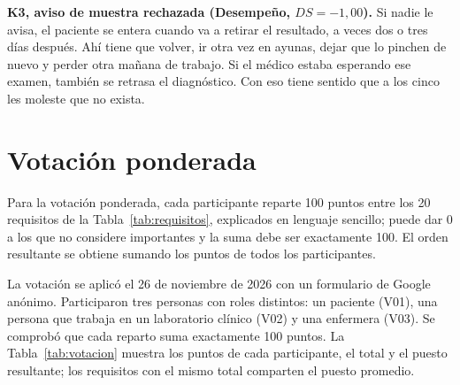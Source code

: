 \documentclass[11pt,a4paper]{article}
\begin{document}
\textbf{K3, aviso de muestra rechazada (Desempeño, $DS = -1{,}00$).} Si nadie le avisa, el paciente se entera cuando va a retirar el resultado, a veces dos o tres días después. Ahí tiene que volver, ir otra vez en ayunas, dejar que lo pinchen de nuevo y perder otra mañana de trabajo. Si el médico estaba esperando ese examen, también se retrasa el diagnóstico. Con eso tiene sentido que a los cinco les moleste que no exista.

\section{Votación ponderada}
Para la votación ponderada, cada participante reparte 100 puntos entre los 20 requisitos de la Tabla~\ref{tab:requisitos}, explicados en lenguaje sencillo; puede dar 0 a los que no considere importantes y la suma debe ser exactamente 100. El orden resultante se obtiene sumando los puntos de todos los participantes.

La votación se aplicó el 26 de noviembre de 2026 con un formulario de Google anónimo. Participaron tres personas con roles distintos: un paciente (V01), una persona que trabaja en un laboratorio clínico (V02) y una enfermera (V03). Se comprobó que cada reparto suma exactamente 100 puntos. La Tabla~\ref{tab:votacion} muestra los puntos de cada participante, el total y el puesto resultante; los requisitos con el mismo total comparten el puesto promedio.
\end{document}
